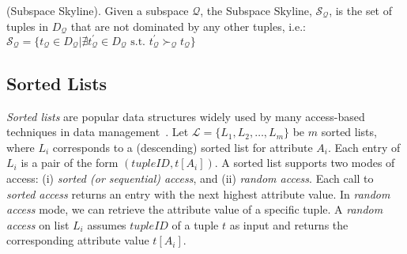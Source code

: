 

\begin{definition}{(Subspace Skyline).}
Given a subspace $\mathcal{Q}$, the Subspace Skyline, $\mathcal{S_\mathcal{Q}}$, is the set of tuples in $D_{\mathcal{Q}}$ that are not dominated by any other tuples, i.e.: $\mathcal{S_\mathcal{Q}} = \{t_{\mathcal{Q}} \in D_{\mathcal{Q}} | \nexists t^\prime_{\mathcal{Q}} \in D_{\mathcal{Q}} \mbox{ s.t. } t^\prime_{\mathcal{Q}} \succ_{\mathcal{Q}} t_{\mathcal{Q}}\}$
\end{definition}

\vspace{-3mm}
\subsection{Sorted Lists}
{\em Sorted lists} are popular data structures widely used by many access-based techniques in data management~\cite{fagin1996combining,fagin2003optimal}.
Let $\mathcal{L} = \{ L_1, L_2, \ldots, L_m \}$ be $m$ sorted lists, where $L_i$ corresponds to a (descending) sorted list for attribute $A_i$. 
Each entry of $L_i$ is a pair of the form $(tupleID, t[A_i])$. 
A sorted list supports two modes of access: (i) \textit{sorted (or sequential) access}, and (ii) \textit{random access}. Each call to \textit{sorted access} returns an entry with the next highest attribute value. 
In \textit{random access} mode, we can retrieve the attribute value of a specific tuple. A \textit{random access} on list $L_i$ assumes $tupleID$ of a tuple $t$ as input and returns the corresponding attribute value $t[A_i]$. 


